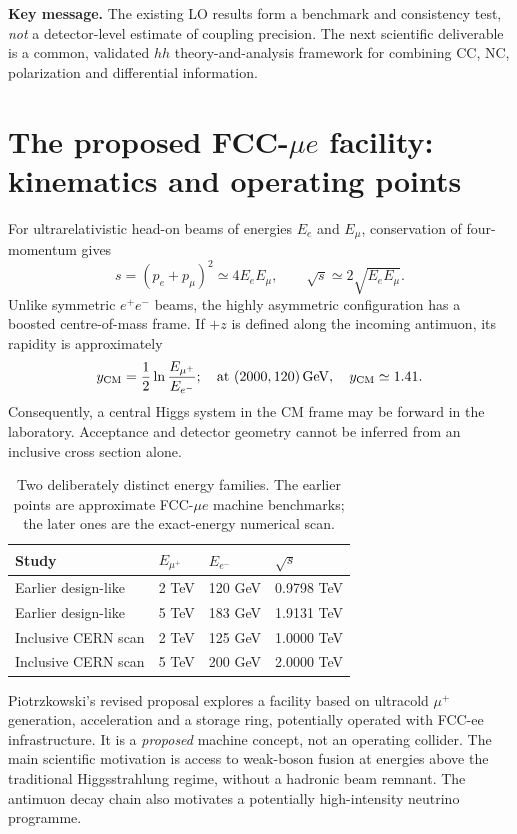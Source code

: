 \documentclass[12pt,a4paper]{article}
\newcommand{\newnote}{\clearpage}
\newcommand{\smallsource}[1]{\par\vspace{-2pt}{\footnotesize\color{gray}\raggedright\emph{Source/status: #1}\par}}
\begin{document}
\textbf{Key message.} The existing LO results form a benchmark and consistency test, \emph{not} a detector-level estimate of coupling precision. The next scientific deliverable is a common, validated $hh$ theory-and-analysis framework for combining CC, NC, polarization and differential information.




\newnote

\section{The proposed FCC-$\mu e$ facility: kinematics and operating points}
For ultrarelativistic head-on beams of energies $E_e$ and $E_\mu$, conservation of four-momentum gives
\begin{equation}
 s=(p_e+p_\mu)^2\simeq4E_eE_\mu,\qquad \sqrt{s}\simeq 2\sqrt{E_eE_\mu}.
 \label{eq:s}
\end{equation}
Unlike symmetric $e^+e^-$ beams, the highly asymmetric configuration has a boosted centre-of-mass frame. If $+z$ is defined along the incoming antimuon, its rapidity is approximately
\begin{equation}
 y_{\rm CM}=\frac12\ln\frac{E_{\mu^+}}{E_{e^-}};
 \quad \text{at }(2000,120)\,{\rm GeV},\quad y_{\rm CM}\simeq1.41.
\end{equation}
Consequently, a central Higgs system in the CM frame may be forward in the laboratory. Acceptance and detector geometry cannot be inferred from an inclusive cross section alone.



\begin{table}[H]\centering\small
\caption{Two deliberately distinct energy families. The earlier points are approximate FCC-$\mu e$ machine benchmarks; the later ones are the exact-energy numerical scan.}
\begin{tabular}{@{}llll@{}}\toprule
Study & $E_{\mu^+}$ & $E_{e^-}$ & $\sqrt{s}$\\\midrule
Earlier design-like & 2 TeV & 120 GeV & 0.9798 TeV\\
Earlier design-like & 5 TeV & 183 GeV & 1.9131 TeV\\
Inclusive CERN scan & 2 TeV & 125 GeV & 1.0000 TeV\\
Inclusive CERN scan & 5 TeV & 200 GeV & 2.0000 TeV\\\bottomrule
\end{tabular}\end{table}
Piotrzkowski's revised proposal \cite{piotr} explores a facility based on ultracold $\mu^+$ generation, acceleration and a storage ring, potentially operated with FCC-ee infrastructure. It is a \emph{proposed} machine concept, not an operating collider. The main scientific motivation is access to weak-boson fusion at energies above the traditional Higgsstrahlung regime, without a hadronic beam remnant. The antimuon decay chain also motivates a potentially high-intensity neutrino programme.
\end{document}
